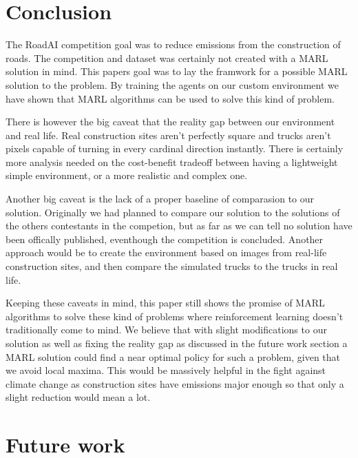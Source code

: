 \documentclass[conference]{IEEEtran}
\begin{document}
\section{Conclusion}

The RoadAI competition goal was to reduce \coo{} emissions from the construction of roads.
The competition and dataset was certainly not created with a MARL solution in mind.
This papers goal was to lay the framwork for a possible MARL solution to the problem.
By training the agents on our custom environment we have shown that MARL algorithms can be used to solve
this  kind of problem.

There is however the big caveat that the reality gap between our environment and real life.
Real construction sites aren't perfectly square and trucks aren't pixels capable of turning in every
cardinal direction instantly. There is certainly more analysis needed on the cost-benefit tradeoff
between having a lightweight simple environment, or a more realistic and complex one.

Another big caveat is the lack of a proper baseline of comparasion to our solution.
Originally we had planned to compare our solution to the solutions of the others contestants in the
competion, but as far as we can tell no solution have been offically published, eventhough the competition
is concluded. Another approach would be to create the environment based on images from real-life
construction sites, and then compare the simulated trucks to the trucks in real life.

Keeping these caveats in mind, this paper still shows the promise of MARL algorithms to solve these kind of
problems where reinforcement learning doesn't traditionally come to mind. We believe that with slight modifications to our solution as well as fixing the reality gap as discussed in the future work section a MARL solution could find a near optimal policy for such a problem, given that we avoid local maxima. This would be massively helpful in the fight against climate change as construction sites have emissions major enough so that only a slight reduction would mean a lot.


\section{Future work}
\end{document}
